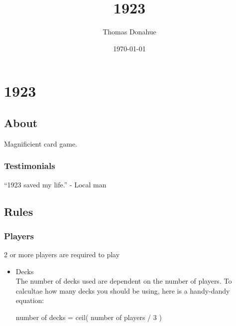 \documentclass[11pt]{article}
\title{1923}
\author{Thomas Donahue}
\date{\today}
\begin{document}
\maketitle

\setcounter{tocdepth}{3}
\tableofcontents
\vspace*{1cm}
\section{1923}
\label{sec-1}
\subsection{About}
\label{sec-1-1}

Magnificient card game.
\subsubsection{Testimonials}
\label{sec-1-1-1}

``1923 saved my life.'' - Local man
\subsection{Rules}
\label{sec-1-2}
\subsubsection{Players}
\label{sec-1-2-1}

2 or more players are required to play
\begin{itemize}

\item Decks\\
\label{sec-1-2-1-1}%
The number of decks used are dependent on the number of players. To
calcultae how many decks you should be using, here is a handy-dandy
equation:

number of decks = ceil( number of players / 3 )

\end{itemize} %
\end{document}
